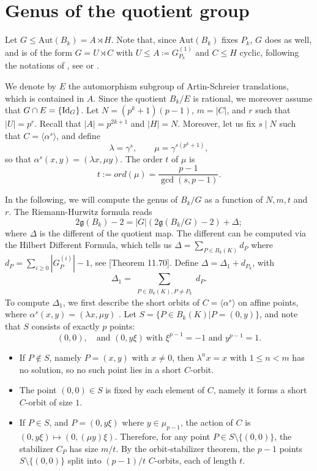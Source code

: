 \documentclass[oneside,a4paper,12pt]{article}
\theoremstyle{plain} %
\theoremstyle{definition} %
\newcommand{\Aut}{\mathrm{Aut}}
\begin{document}
\section{Genus of the quotient group}\label{Section5}


Let $G\leq \Aut(B_k)=A\rtimes H$. 
Note that, since $\Aut(B_k)$ fixes $P_k$, $G$ does as well, and is of the form $ G=U\rtimes C $ with $ U\le A\coloneqq G^{(1)}_{P_k}$ and $ C\le H $ cyclic, following the notations of , see \cite[Theorem 11.49]{HKT} or \cite[ Chapter IV, Corollary 4]{StichBook}.



We denote by $E$ the automorphism subgroup of Artin-Schreier translations, which is contained in $A$.
Since the quotient $B_k/E$ is rational, we moreover assume that $G\cap E=\{\textup{Id}_G\}$.
Let $N=(p^k+1)(p-1)$, $m=|C|$, and $r$ such that $|U|=p^r$. Recall that $|A|=p^{2k+1}$ and $|H|=N$. Moreover, let us fix $s\mid N$ such that $C=\langle\alpha^s\rangle$, and define
\[
\lambda=\gamma^s,\qquad
\mu=\gamma^{s(p^k+1)},
\]
so that $ \alpha^s(x,y)=(\lambda x,\mu y) $. The order $t$ of $ \mu $ is
\[
t:=ord(\mu)=\frac{p-1}{\gcd(s,p-1)}.
\]


In the following, we will compute the genus of $B_k/G$ as a function of $N,m,t$ and $r$.
The Riemann-Hurwitz formula reads
\[
2\mathfrak{g}(B_k)-2=|G|(2\mathfrak{g}(B_k/G)-2)+\Delta;
\]
where $\Delta$ is the different of the quotient map. The different can be computed via the Hilbert Different Formula, which tells us $\Delta=\sum_{P\in B_k(K) }d_P$ where $d_P=\sum_{i\geq 0}|G_P^{(i)}|-1$, see \cite{HKT}[Theorem 11.70].
Define $\Delta=\Delta_1+d_{P_{k}}$, with 
\[
\Delta_1=\sum_{\substack{P\in B_k(K), P\neq P_{k}}}d_P.
\]
To compute $\Delta_1$, we first describe the short orbits of $C=\langle \alpha^s\rangle$ on affine points, where $\alpha^s(x,y)=(\lambda x,\mu y)$ .
Let $S=\{P\in B_k(K) |P=(0,y)\}$, and note that $S$ consists of exactly $ p $ points:
\[
(0,0),\quad \text{and }(0,y\xi)\ \text{with }\xi^{p-1}=-1\text{ and }y^{p-1}=1.
\]

\begin{itemize}
\item If $P\notin S$, namely $P=(x,y)$ with $ x\neq 0 $, then $ \lambda^n x=x $ with $ 1\le n<m $ has no solution, so no such point lies in a short $ C $-orbit.
\item  The point $ (0,0)\in S $ is fixed by each element of $ C $, namely it forms a short $C$-orbit of size $1$.
\item If $P\in S$, and $P=(0,y\xi) $ where $y\in\mu_{p-1} $, the action of $C$ is 
$ (0,y\xi)\mapsto(0,(\mu y)\xi) $. Therefore, for any point $P\in S\setminus \{(0,0)\}$, the stabilizer $C_P$ has size $ m/t $. By the orbit-stabilizer theorem, the  $ p-1 $ points $ S\setminus \{(0,0)\}$ split into $ (p-1)/t $ $C$-orbits, each of length $ t $.
\end{itemize}
\end{document}
